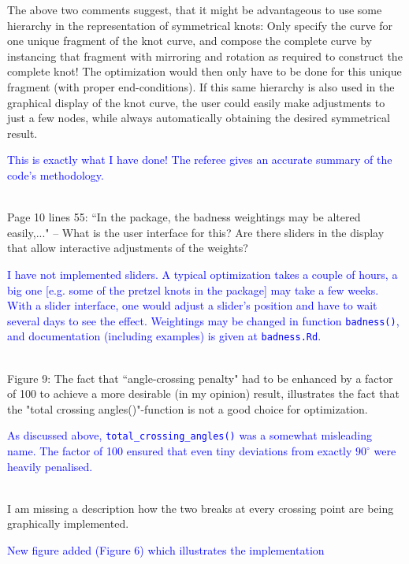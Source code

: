 \documentclass[12pt]{article}
\begin{document}
{The above two comments suggest, that it might be advantageous to use
  some hierarchy in the representation of symmetrical knots: Only
  specify the curve for one unique fragment of the knot curve, and
  compose the complete curve by instancing that fragment with
  mirroring and rotation as required to construct the complete knot!
  The optimization would then only have to be done for this unique
  fragment (with proper end-conditions).  If this same hierarchy is
  also used in the graphical display of the knot curve, the user could
  easily make adjustments to just a few nodes, while always
  automatically obtaining the desired symmetrical result.}

\textcolor{blue}{This is exactly what I have done!  The referee gives
  an accurate summary of the code's methodology.\\ \\}

Page 10 lines 55: ``In the package, the badness weightings may be
altered easily,..."  -- What is the user interface for this?  Are
there sliders in the display that allow interactive adjustments of the
weights?

\textcolor{blue}{I have not implemented sliders.  A typical
  optimization takes a couple of hours, a big one [e.g. some of the
    pretzel knots in the package] may take a few weeks.  With a slider
  interface, one would adjust a slider's position and have to wait
  several days to see the effect.  Weightings may be changed in
  function {\tt badness()}, and documentation (including examples) is
  given at {\tt badness.Rd}.\\ \\}

  
Figure 9: The fact that ``angle-crossing penalty" had to be enhanced by
a factor of 100 to achieve a more desirable (in my opinion) result,
illustrates the fact that the "total crossing angles()"-function is
not a good choice for optimization.

\textcolor{blue}{As discussed above, {\tt total\_crossing\_angles()}
  was a somewhat misleading name.  The factor of 100 ensured that even
  tiny deviations from exactly $90^\circ$ were heavily penalised.\\ \\}

I am missing a description how the two breaks at every crossing point
are being graphically implemented.

\textcolor{blue}{New figure added (Figure 6) which illustrates the
  implementation\\ \\}
\end{document}
